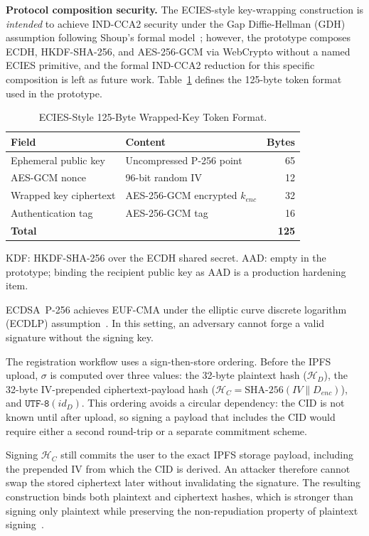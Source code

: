 \documentclass{ieeeaccess}
\begin{document}
\textbf{Protocol composition security.} The ECIES-style key-wrapping construction is
\emph{intended} to achieve \textsc{IND-CCA2} security under the Gap
Diffie-Hellman (\textsc{GDH}) assumption following Shoup's formal
model~\cite{shoup2001ecies,ieee1363a2004}; however, the prototype composes
\mbox{ECDH}, \mbox{HKDF-SHA-256}, and \mbox{AES-256-GCM} via WebCrypto
without a named ECIES primitive, and the formal \textsc{IND-CCA2} reduction
for this specific composition is left as future work.
Table~\ref{tab:eciestoken} defines the 125-byte token format used in the
prototype.

\begin{table}[ht]
\caption{ECIES-Style 125-Byte Wrapped-Key Token Format.\label{tab:eciestoken}}
\centering
\small
\begin{tabular}{llr}
\hline
Field & Content & Bytes \\
\hline
Ephemeral public key & Uncompressed P-256 point & 65 \\
AES-GCM nonce & 96-bit random IV & 12 \\
Wrapped key ciphertext & AES-256-GCM encrypted $k_{enc}$ & 32 \\
Authentication tag & AES-256-GCM tag & 16 \\
\hline
\textbf{Total} & & \textbf{125} \\
\hline
\end{tabular}
\vspace{2pt}
\footnotesize\parbox{\columnwidth}{KDF: HKDF-SHA-256 over the ECDH shared secret. AAD: empty in the prototype; binding the recipient public key as AAD is a production hardening item.}
\end{table}
%
\textsc{ECDSA}~P-256 achieves \textsc{EUF-CMA} under the elliptic curve discrete logarithm (\textsc{ECDLP}) assumption~\cite{fips1865}. In this setting, an adversary cannot forge a valid signature without the signing key.

The registration workflow uses a sign-then-store ordering. Before the IPFS upload, $\sigma$ is computed over three values: the 32-byte plaintext hash ($\mathcal{H}_D$), the 32-byte IV-prepended ciphertext-payload hash ($\mathcal{H}_C = \text{SHA-256}(IV \| D_{enc})$), and $\texttt{UTF-8}(id_D)$. This ordering avoids a circular dependency: the CID is not known until after upload, so signing a payload that includes the CID would require either a second round-trip or a separate commitment scheme.

Signing $\mathcal{H}_C$ still commits the user to the exact IPFS storage payload, including the prepended IV from which the CID is derived. An attacker therefore cannot swap the stored ciphertext later without invalidating the signature. The resulting construction binds both plaintext and ciphertext hashes, which is stronger than signing only plaintext while preserving the non-repudiation property of plaintext signing~\cite{fips1865,ieee1363a2004}.
\end{document}
